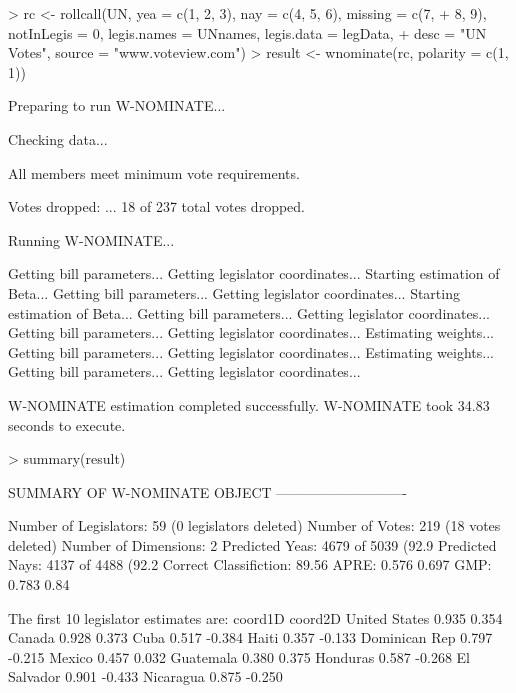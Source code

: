 \documentclass[12pt]{article}
\begin{document}
\begin{Schunk}
\begin{Sinput}
> rc <- rollcall(UN, yea = c(1, 2, 3), nay = c(4, 5, 6), missing = c(7, 
+     8, 9), notInLegis = 0, legis.names = UNnames, legis.data = legData, 
+     desc = "UN Votes", source = "www.voteview.com")
> result <- wnominate(rc, polarity = c(1, 1))
\end{Sinput}
\begin{Soutput}
Preparing to run W-NOMINATE...

	Checking data...

		All members meet minimum vote requirements.

		Votes dropped:
		... 18 of 237 total votes dropped.

	Running W-NOMINATE...

		Getting bill parameters...
		Getting legislator coordinates...
		Starting estimation of Beta...
		Getting bill parameters...
		Getting legislator coordinates...
		Starting estimation of Beta...
		Getting bill parameters...
		Getting legislator coordinates...
		Getting bill parameters...
		Getting legislator coordinates...
		Estimating weights...
		Getting bill parameters...
		Getting legislator coordinates...
		Estimating weights...
		Getting bill parameters...
		Getting legislator coordinates...


W-NOMINATE estimation completed successfully.
W-NOMINATE took 34.83 seconds to execute.
\end{Soutput}
\end{Schunk}

\begin{Schunk}
\begin{Sinput}
> summary(result)
\end{Sinput}
\begin{Soutput}
SUMMARY OF W-NOMINATE OBJECT
----------------------------

Number of Legislators:	  59 (0 legislators deleted)
Number of Votes:	  219 (18 votes deleted)
Number of Dimensions:	  2
Predicted Yeas:		  4679 of 5039 (92.9%
Predicted Nays:		  4137 of 4488 (92.2%
Correct Classifiction:	  89.56%
APRE:			  0.576 0.697
GMP:			  0.783 0.84 


The first 10 legislator estimates are:
              coord1D coord2D
United States   0.935   0.354
Canada          0.928   0.373
Cuba            0.517  -0.384
Haiti           0.357  -0.133
Dominican Rep   0.797  -0.215
Mexico          0.457   0.032
Guatemala       0.380   0.375
Honduras        0.587  -0.268
El Salvador     0.901  -0.433
Nicaragua       0.875  -0.250
\end{Soutput}
\end{Schunk}
\end{document}
